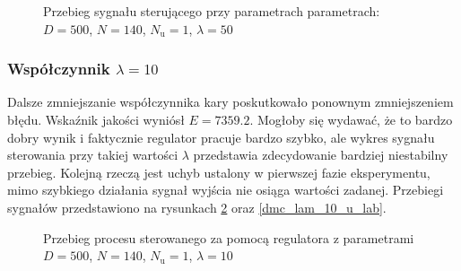 \begin{figure}[b]
    \centering
    \caption{Przebieg sygnału sterującego przy parametrach parametrach: $D = 500$, $N = 140$, $N_{\mathrm{u}} = 1$, $\lambda = 50$}
    \label{dmc_lam_50_u}
\end{figure}

\subsubsection{Współczynnik $\lambda = 10$}
Dalsze zmniejszanie współczynnika kary poskutkowało ponownym zmniejszeniem błędu. Wskaźnik jakości wyniósł $E = \num{7359,2}$. Mogłoby się wydawać, że to bardzo dobry wynik i faktycznie regulator pracuje bardzo szybko, ale wykres sygnału sterowania przy takiej wartości $\lambda$ przedstawia zdecydowanie bardziej niestabilny przebieg. Kolejną rzeczą jest uchyb ustalony w pierwszej fazie eksperymentu, mimo szybkiego działania sygnał wyjścia nie osiąga wartości zadanej. Przebiegi sygnałów przedstawiono na rysunkach \ref{dmc_lam_10_y_lab} oraz \ref{dmc_lam_10_u_lab}. 

\begin{figure}[t]
    \centering
    \caption{Przebieg procesu sterowanego za pomocą regulatora z parametrami $D = 500$, $N = 140$, $N_{\mathrm{u}} = 1$, $\lambda = 10$}
    \label{dmc_lam_10_y_lab}
\end{figure}

